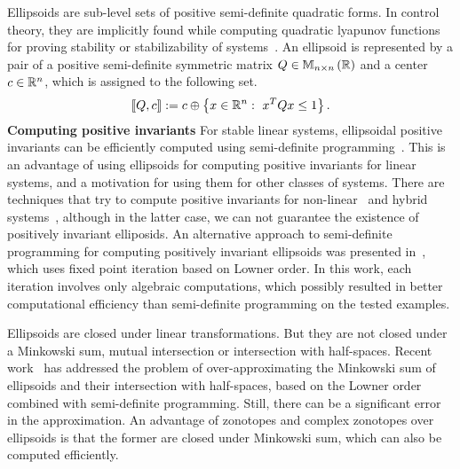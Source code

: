 Ellipsoids are sub-level sets of positive semi-definite quadratic
forms.  In control theory, they are implicitly found while computing
quadratic lyapunov functions for proving stability or stabilizability of
systems~\cite{todo}.  An ellipsoid is represented by a pair of a
positive semi-definite symmetric matrix $Q\in\mathbb{M}_{n\times n}\left(\mathbb{R}\right)$ and a center
$c\in\mathbb{R}^n$, which is assigned to the following set.
%
\[
\left\llbracket Q,c\right\rrbracket:=c\oplus\left\{x\in\mathbb{R}^n:~{x}^TQx\leq 1\right\}.
\]
%
{\bf Computing positive invariants} For stable linear systems,
ellipsoidal positive invariants can be efficiently computed using
semi-definite programming~\cite{todo}.  This is an advantage of using
ellipsoids for computing positive invariants for linear systems, and a
motivation for using them for other classes of systems.  There are
techniques that try to compute positive invariants for
non-linear~\cite{todo} and hybrid systems~\cite{todo}, although in the
latter case, we can not guarantee the existence of positively
invariant elliposids.  An alternative approach to semi-definite
programming for computing positively invariant ellipsoids was
presented in~\cite{todo}, which uses fixed point iteration based on
Lowner order.  In this work, each iteration involves only algebraic
computations, which possibly resulted in better computational
efficiency than semi-definite programming on the tested examples.

Ellipsoids are closed under linear transformations.  But they are not
closed under a Minkowski sum, mutual intersection or intersection with
half-spaces.  Recent work~\cite{todo} has addressed the problem of
over-approximating the Minkowski sum of ellipsoids and their
intersection with half-spaces, based on the Lowner order combined with
semi-definite programming.  Still, there can be a significant error in
the approximation.  An advantage of zonotopes and complex zonotopes
over ellipsoids is that the former are closed under Minkowski sum,
which can also be computed efficiently.

